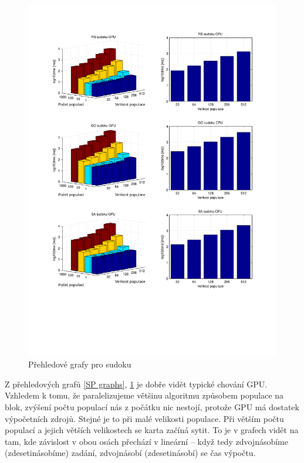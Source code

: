 \begin{figure}[h!]
\begin{center}
  \includegraphics[width=\textwidth]{img/graphsSU}
  \caption{Přehledové grafy pro sudoku}\label{SU graphs}
  \end{center}
\end{figure}
\clearpage

Z přehledových grafů \ref{SP graphs}, \ref{SU graphs} je dobře vidět typické chování GPU. Vzhledem k tomu, že paralelizujeme většinu algoritmu způsobem populace na blok, zvýšení počtu populací nás z počátku nic nestojí, protože GPU má dostatek výpočetních zdrojů. Stejné je to při malé velikosti populace. Při větším počtu populací a jejich větších velikostech se karta začíná sytit. To je v grafech vidět na tam, kde závislost v obou osách přechází v lineární -- když tedy zdvojnásobíme (zdesetinásobíme) zadání, zdvojnásobí (zdesetinásobí) se čas výpočtu.


